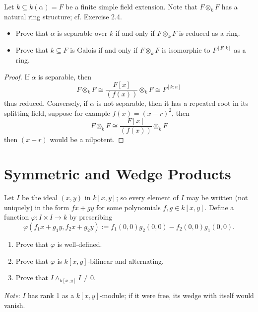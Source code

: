 \documentclass[openany]{book}
\newcommand{\lambdaprod}{\wedge} %
\begin{document}
    
    \begin{prob}[2.10]
    Let \( k \subseteq k(\alpha) = F \) be a finite simple field extension. Note that \( F \otimes_k F \) has a natural ring structure; cf. Exercise 2.4.
    
    \begin{itemize}
        \item Prove that \( \alpha \) is separable over \( k \) if and only if \( F \otimes_k F \) is reduced as a ring.
        \item Prove that \( k \subseteq F \) is Galois if and only if \( F \otimes_k F \) is isomorphic to \( F^{[F:k]} \) as a ring.
    \end{itemize}
    \end{prob}
\begin{proof}
    If $\alpha$ is separable, then 
    \begin{equation*}
        F\otimes_kF\cong \frac{F[x]}{(f(x))}\otimes_kF\cong F^{[k:n]}
    \end{equation*}
    thus reduced.
    Conversely, if $\alpha$ is not separable, then it has a repeated root in its splitting field, suppose for example $f(x)=(x-r)^2$, then 
    \begin{equation*}
        F\otimes_kF\cong\frac{F[x]}{(f(x))}\otimes_kF
    \end{equation*}
    then $(x-r)$ would be a nilpotent.
\end{proof}



\section{Symmetric and Wedge Products}
\begin{prob}[4.3]
    Let \( I \) be the ideal \((x, y)\) in \( k[x, y] \); so every element of \( I \) may be written (not uniquely) in the form \( fx + gy \) for some polynomials \( f, g \in k[x, y] \). Define a function \(\varphi : I \times I \to k\) by prescribing
    \[
    \varphi(f_1 x + g_1 y, f_2 x + g_2 y) := f_1(0, 0)g_2(0, 0) - f_2(0, 0)g_1(0, 0).
    \]
    \begin{enumerate}
        \item Prove that \(\varphi\) is well-defined.
        \item Prove that \(\varphi\) is \(k[x, y]\)-bilinear and alternating.
        \item Prove that \(I \lambdaprod_{k[x, y]} I \neq 0\).
    \end{enumerate}
    \textit{Note}: \(I\) has rank 1 as a \(k[x, y]\)-module; if it were free, its wedge with itself would vanish.
    \end{prob}
    
\end{document}
